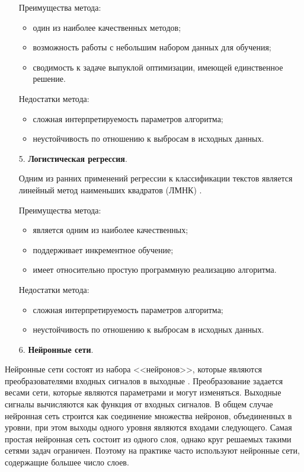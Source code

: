 \begin{enumerate}
Преимущества метода: 
\begin{itemize}
\item один из наиболее качественных методов;
\item возможность работы с небольшим набором данных для обучения;
\item сводимость к задаче выпуклой оптимизации, имеющей единственное решение. 
\end{itemize}

Недостатки метода: 
\begin{itemize}
\item сложная интерпретируемость параметров алгоритма;
\item неустойчивость по отношению к выбросам в исходных данных. 
\end{itemize}

\item[5.] \textbf{Логистическая регрессия}.

Одним из ранних применений регрессии к классификации текстов является линейный метод наименьших квадратов (ЛМНК) \cite{linear}.

Преимущества метода:
\begin{itemize}
\item является одним из наиболее качественных;
\item поддерживает инкрементное обучение; 
\item имеет относительно простую программную реализацию алгоритма. 
\end{itemize}

Недостатки метода: 
\begin{itemize}
\item сложная интерпретируемость параметров алгоритма;
\item неустойчивость по отношению к выбросам в исходных данных. 
\end{itemize}

\item[6.] \textbf{Нейронные сети}.
\end{enumerate}

Нейронные сети состоят из набора <<нейронов>>, которые являются преобразователями входных сигналов в выходные \cite{neuron}. Преобразование задается весами сети, которые являются параметрами и могут изменяться. Выходные сигналы вычисляются как функция от входных сигналов. В общем случае нейронная сеть строится как соединение множества нейронов, объединенных в уровни, при этом выходы одного уровня являются входами следующего.
Самая простая нейронная сеть состоит из одного слоя, однако круг решаемых такими сетями задач ограничен. Поэтому на практике часто используют нейронные сети, содержащие большее число слоев.

